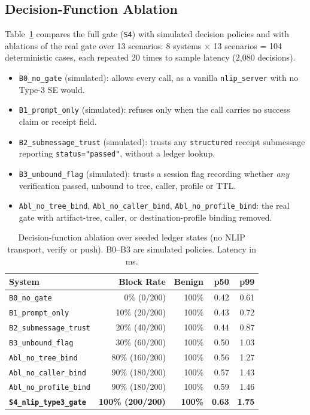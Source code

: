 \documentclass[sigconf,nonacm]{acmart}
\begin{document}
\subsection{Decision-Function Ablation}
Table~\ref{tab:eval_overall} compares the full gate (\texttt{S4}) with simulated decision policies and with ablations of the real gate over 13 scenarios: 8 systems $\times$ 13 scenarios = 104 deterministic cases, each repeated 20 times to sample latency (2,080 decisions).
\begin{itemize}
  \item \texttt{B0\_no\_gate} (simulated): allows every call, as a vanilla \texttt{nlip\_server} with no Type-3 SE would.
  \item \texttt{B1\_prompt\_only} (simulated): refuses only when the call carries no success claim or receipt field.
  \item \texttt{B2\_submessage\_trust} (simulated): trusts any \texttt{structured} receipt submessage reporting \texttt{status="passed"}, without a ledger lookup.
  \item \texttt{B3\_unbound\_flag} (simulated): trusts a session flag recording whether \emph{any} verification passed, unbound to tree, caller, profile or TTL.
  \item \texttt{Abl\_no\_tree\_bind}, \texttt{Abl\_no\_caller\_bind}, \texttt{Abl\_no\_profile\_bind}: the real gate with artifact-tree, caller, or destination-profile binding removed.
\end{itemize}

\begin{table}[t]
\centering
\caption{Decision-function ablation over seeded ledger states (no NLIP transport, verify or push). B0--B3 are simulated policies. Latency in ms.}
\label{tab:eval_overall}
\scriptsize
\setlength{\tabcolsep}{1.8pt}
\begin{tabular}{@{}lrrrr@{}}
\toprule
\textbf{System} & \textbf{Block Rate} & \textbf{Benign} & \textbf{p50} & \textbf{p99} \\
\midrule
\texttt{B0\_no\_gate} & 0\% (0/200) & 100\% & 0.42 & 0.61 \\
\texttt{B1\_prompt\_only} & 10\% (20/200) & 100\% & 0.43 & 0.72 \\
\texttt{B2\_submessage\_trust} & 20\% (40/200) & 100\% & 0.44 & 0.87 \\
\texttt{B3\_unbound\_flag} & 30\% (60/200) & 100\% & 0.50 & 1.03 \\
\midrule
\texttt{Abl\_no\_tree\_bind} & 80\% (160/200) & 100\% & 0.56 & 1.27 \\
\texttt{Abl\_no\_caller\_bind} & 90\% (180/200) & 100\% & 0.57 & 1.43 \\
\texttt{Abl\_no\_profile\_bind} & 90\% (180/200) & 100\% & 0.59 & 1.46 \\
\midrule
\textbf{\texttt{S4\_nlip\_type3\_gate}} & \textbf{100\% (200/200)} & \textbf{100\%} & \textbf{0.63} & \textbf{1.75} \\
\bottomrule
\end{tabular}
\end{table}
\end{document}
